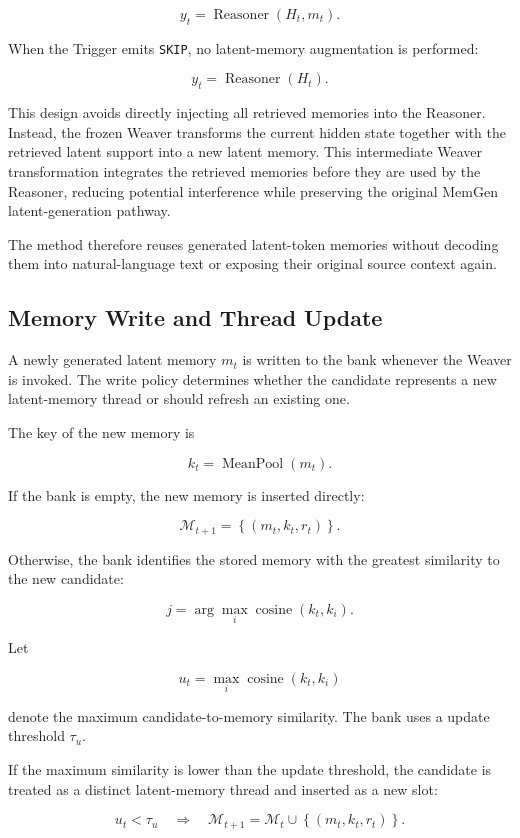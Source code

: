 \[
y_t =
\operatorname{Reasoner}(H_t,m_t).
\]

When the Trigger emits \texttt{SKIP}, no latent-memory augmentation is performed:

\[
y_t =
\operatorname{Reasoner}(H_t).
\]

This design avoids directly injecting all retrieved memories into the Reasoner. Instead, the frozen Weaver transforms the current hidden state together with the retrieved latent support into a new latent memory. This intermediate Weaver transformation integrates the retrieved memories before they are used by the Reasoner, reducing potential interference while preserving the original MemGen latent-generation pathway.

The method therefore reuses generated latent-token memories without decoding them into natural-language text or exposing their original source context again.

\subsection{Memory Write and Thread Update}

A newly generated latent memory $m_t$ is written to the bank whenever the Weaver is invoked. The write policy determines whether the candidate represents a new latent-memory thread or should refresh an existing one.

The key of the new memory is

\[
k_t =
\operatorname{MeanPool}(m_t).
\]

If the bank is empty, the new memory is inserted directly:

\[
\mathcal{M}_{t+1} =
\left\{
\left(m_t,k_t,r_t\right)
\right\}.
\]

Otherwise, the bank identifies the stored memory with the greatest similarity to the new candidate:

\[
j =
\arg\max_i
\operatorname{cosine}(k_t,k_i).
\]

Let

\[
u_t =
\max_i
\operatorname{cosine}(k_t,k_i)
\]

denote the maximum candidate-to-memory similarity. The bank uses a update threshold $\tau_u$.

If the maximum similarity is lower than the update threshold, the candidate is treated as a distinct latent-memory thread and inserted as a new slot:

\[
u_t<\tau_u
\quad\Rightarrow\quad
\mathcal{M}_{t+1} =
\mathcal{M}_t
\cup
\left\{
\left(m_t,k_t,r_t\right)
\right\}.
\]

